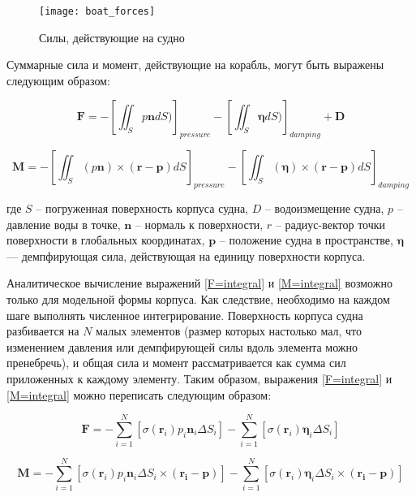 \begin{figure}[ht]
\begin{center}
\texttt{[image: boat\_forces]}
\end{center}
\caption{Силы, действующие на судно}
\label{boat_forces}
\end{figure}

Суммарные сила и момент, действующие на корабль, могут быть выражены следующим образом:

\begin{equation}
	\mathbf{F} = 
		-\left[ \iint_{S} p \mathbf{n} dS ) 		\right]_{pressure}
		-\left[ \iint_{S} \boldsymbol{\eta} dS ) 	\right]_{damping}
		+ \mathbf{D}
	\label{F=integral}
\end{equation}

\begin{equation}
	\mathbf{M} = 
	-\left[ \iint_{S} 
		\left( p \mathbf{n} \right) \times 
		\left( \mathbf{r} - \mathbf{p} \right) dS	
	\right]_{pressure}
	-\left[ \iint_{S} 
		\left( \boldsymbol{\eta} \right) \times 
		\left( \mathbf{r} - \mathbf{p} \right) dS	
	\right]_{damping}
	\label{M=integral}
\end{equation}

где $S$ – погруженная поверхность корпуса судна, $D$ – водоизмещение судна, $p$ – давление воды в точке, $\mathbf{n}$ – нормаль к поверхности, $r$ – радиус-вектор точки поверхности в глобальных координатах, $\mathbf{p}$ – положение судна в пространстве, $\boldsymbol{\eta}$ --- демпфирующая сила, действующая на единицу поверхности корпуса.

Аналитическое вычисление выражений \eqref{F=integral} и \eqref{M=integral} возможно только для модельной формы корпуса. Как следствие, необходимо на каждом шаге выполнять численное интегрирование. Поверхность корпуса судна разбивается на $N$ малых элементов (размер которых настолько мал, что изменением давления или демпфирующей силы вдоль элемента можно пренебречь), и общая сила и момент рассматривается как сумма сил приложенных к каждому элементу. Таким образом, выражения \eqref{F=integral} и \eqref{M=integral} можно переписать следующим образом:

\begin{equation}
	\mathbf{F} = 
		-\sum_{i=1}^{N} \left[
			\sigma (\mathbf{r}_i) p_i \mathbf{n}_i \Delta S_i
		\right]
		-\sum_{i=1}^{N} \left[
			\sigma (\mathbf{r}_i) \boldsymbol{\eta}_i \Delta S_i
		\right]
\end{equation}

\begin{equation}
	\mathbf{M} = 
		-\sum_{i=1}^{N} \left[
			\sigma (\mathbf{r}_i) p_i \mathbf{n}_i \Delta S_i \times (\mathbf{r_i} - \mathbf{p})
		\right]
		-\sum_{i=1}^{N} \left[
			\sigma (\mathbf{r}_i) \boldsymbol{\eta}_i \Delta S_i \times (\mathbf{r_i} - \mathbf{p})
		\right]
\end{equation}

